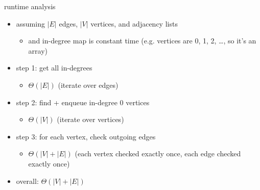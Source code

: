 \begin{frame}{runtime analysis}
\begin{itemize}
\item assuming $|E|$ edges, $|V|$ vertices, and adjacency lists
\begin{itemize}
\item and in-degree map is constant time (e.g. vertices are 0, 1, 2, \ldots, so it's an array)
\end{itemize}
\item step 1: get all in-degrees
    \begin{itemize}
    \item $\Theta(|E|)$ (iterate over edges)
    \end{itemize}
\item step 2: find + enqueue in-degree 0 vertices
    \begin{itemize}
    \item $\Theta(|V|)$ (iterate over vertices)
    \end{itemize}
\item step 3: for each vertex, check outgoing edges
    \begin{itemize}
    \item $\Theta(|V|+|E|)$ (each vertex checked exactly once, each edge checked exactly once)
    \end{itemize}
\vspace{.5cm}
\item overall: $\Theta(|V|+|E|)$
\end{itemize}
\end{frame}


